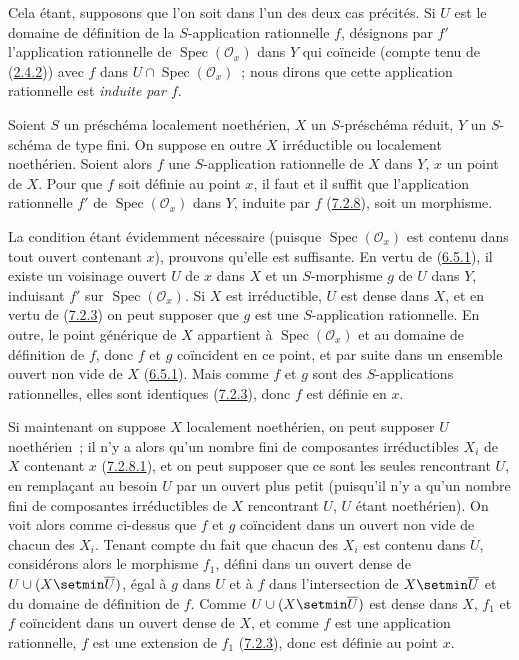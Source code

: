 Cela étant, supposons que l'on soit dans l'un des deux cas précités. Si $U$
est le domaine de définition de la $S$-application rationnelle $f$, désignons
par $f'$ l'application rationnelle de $\operatorname{Spec}(\mathscr{O}_x)$
dans $Y$ qui coïncide (compte tenu de (\hyperref[I.2.4.2-fr]{2.4.2})) avec
$f$ dans $U\cap\operatorname{Spec}(\mathscr{O}_x)$~; nous dirons que cette
application rationnelle est \emph{induite par $f$}.

\begin{proposition}[7.2.9]
\label{I.7.2.9-fr}
Soient $S$ un préschéma localement noethérien, $X$ un $S$-préschéma réduit,
$Y$ un $S$-schéma de type fini. On suppose en outre $X$ irréductible ou
localement noethérien. Soient alors $f$ une $S$-application rationnelle de
$X$ dans $Y$, $x$ un point de $X$. Pour que $f$ soit définie au point $x$,
il faut et il suffit que l'application rationnelle $f'$ de
$\operatorname{Spec}(\mathscr{O}_x)$ dans $Y$, induite par $f$
\textup{(\hyperref[I.7.2.8-fr]{7.2.8})}, soit un morphisme.
\end{proposition}

La condition étant évidemment nécessaire (puisque
$\operatorname{Spec}(\mathscr{O}_x)$ est contenu dans tout ouvert contenant
$x$), prouvons qu'elle est suffisante. En vertu de
(\hyperref[I.6.5.1-fr]{6.5.1}), il existe un voisinage ouvert $U$ de $x$ dans
$X$ et un $S$-morphisme $g$ de $U$ dans $Y$, induisant $f'$ sur
$\operatorname{Spec}(\mathscr{O}_x)$. Si $X$ est irréductible, $U$ est dense
dans $X$, et en vertu de (\hyperref[I.7.2.3-fr]{7.2.3}) on peut supposer que
$g$ est une $S$-application rationnelle. En outre, le point générique de $X$
appartient à $\operatorname{Spec}(\mathscr{O}_x)$ et au domaine de définition
de $f$, donc $f$ et $g$ coïncident en ce point, et par suite dans un ensemble
ouvert non vide de $X$ (\hyperref[I.6.5.1-fr]{6.5.1}). Mais comme $f$ et $g$
sont des $S$-applications rationnelles, elles sont identiques
(\hyperref[I.7.2.3-fr]{7.2.3}), donc $f$ est définie en $x$.

Si maintenant on suppose $X$ localement noethérien, on peut supposer $U$
noethérien~; il n'y a alors qu'un nombre fini de composantes irréductibles
$X_i$ de $X$ contenant $x$ (\hyperref[I.7.2.8.1-fr]{7.2.8.1}), et on peut
supposer que ce sont les seules rencontrant $U$, en remplaçant au besoin $U$
par un ouvert plus petit (puisqu'il n'y a qu'un nombre fini de composantes
irréductibles de $X$ rencontrant $U$, $U$ étant noethérien). On voit alors
comme ci-dessus que $f$ et $g$ coïncident dans un ouvert non vide de chacun
des $X_i$. Tenant compte du fait que chacun des $X_i$ est contenu dans
$\overline U$, considérons alors le morphisme $f_1$, défini dans un ouvert
dense de $U\cup(X\setmin\overline U)$, égal à $g$ dans $U$ et à $f$ dans
l'intersection de $X\setmin\overline U$ et du domaine de définition de $f$. Comme
$U\cup(X\setmin\overline U)$ est dense dans $X$, $f_1$ et $f$ coïncident dans un
ouvert dense de $X$, et comme $f$ est une application rationnelle, $f$ est
une extension de $f_1$ (\hyperref[I.7.2.3-fr]{7.2.3}), donc est définie au
point $x$.

